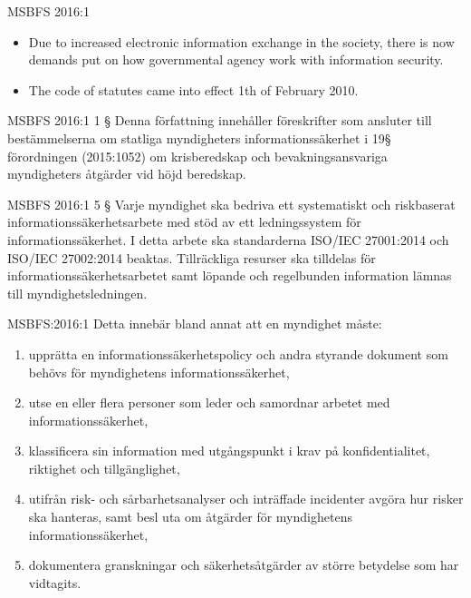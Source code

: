 \documentclass{beamer}
\begin{document}
\begin{frame}{MSBFS 2016:1}
  \begin{itemize}
    \item Due to increased electronic information exchange in the society, there
      is now demands put on how governmental agency work with information
      security.

    \item The code of statutes came into effect 1th of February 2010.

  \end{itemize}
\end{frame}

\begin{frame}{MSBFS 2016:1}
  1 §  Denna författning innehåller föreskrifter som ansluter till
  bestämmelserna om statliga myndigheters informationssäkerhet i 19§
  förordningen (2015:1052) om krisberedskap och bevakningsansvariga
  myndigheters åtgärder vid höjd beredskap. 

\end{frame}

\begin{frame}{MSBFS 2016:1}
  5 §  Varje myndighet ska bedriva ett systematiskt och riskbaserat
  informationssäkerhetsarbete med stöd av ett ledningssystem för
  informationssäkerhet. I detta arbete ska standarderna ISO/IEC 27001:2014 och
  ISO/IEC 27002:2014 beaktas. Tillräckliga resurser ska tilldelas för
  informationssäkerhetsarbetet samt löpande och regelbunden information lämnas
  till myndighetsledningen.
  
\end{frame}
\begin{frame}{MSBFS:2016:1}
  Detta innebär bland annat att en myndighet måste: 
  \begin{enumerate}
    \item upprätta en informationssäkerhetspolicy och andra styrande dokument 
      som behövs för myndighetens informationssäkerhet,
    \item utse en eller flera personer som leder och samordnar arbetet med 
      informationssäkerhet,
    \item klassificera sin information med utgångspunkt i krav på 
      konfidentialitet, riktighet och tillgänglighet,
    \item utifrån risk- och sårbarhetsanalyser och inträffade incidenter 
      avgöra hur risker ska hanteras, samt besl uta om åtgärder för 
      myndighetens informationssäkerhet,
    \item dokumentera granskningar och säkerhetsåtgärder av större betydelse 
      som har vidtagits.
  \end{enumerate}
\end{frame}
\end{document}
